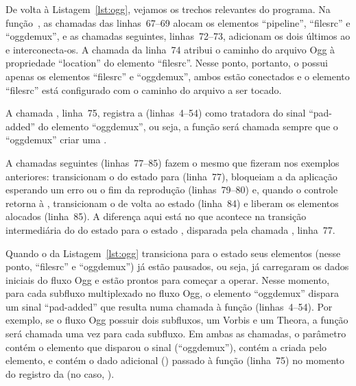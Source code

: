 \documentclass{SBCbookchapter}
\begin{document}
De volta à Listagem~\ref{lst:ogg}, vejamos os trechos relevantes do
programa.  Na função~, as chamadas das linhas~67--69 alocam os
elementos ``pipeline'', ``filesrc'' e ``oggdemux'', e as chamadas seguintes,
linhas~72--73, adicionam os dois últimos ao  e interconecta-os.
A chamada da linha~74 atribui o caminho do arquivo Ogg à propriedade
``location'' do elemento ``filesrc''.  Nesse ponto, portanto, o
 possui apenas os elementos ``filesrc'' e ``oggdemux'', ambos
estão conectados e o elemento ``filesrc'' está configurado com o caminho do
arquivo a ser tocado.

A chamada , linha~75, registra a 
 (linhas~4--54) como tratadora do sinal ``pad-added'' do
elemento ``oggdemux'', ou seja, a função  será chamada
sempre que o ``oggdemux'' criar uma .

A chamadas seguintes (linhas~77--85) fazem o mesmo que fizeram nos exemplos
anteriores: transicionam o  do estado  para
 (linha~77), bloqueiam a  da aplicação esperando um
erro ou o fim da reprodução (linhas~79--80) e, quando o controle retorna à
, transicionam o  de volta ao estado 
(linha~84) e liberam os elementos alocados (linha~85).  A diferença aqui
está no que acontece na transição intermediária do  do estado
 para o estado , disparada pela chamada
, linha~77.

Quando o  da Listagem~\ref{lst:ogg} transiciona para o estado
 seus elementos (nesse ponto, ``filesrc'' e ``oggdemux'') já
estão pausados, ou seja, já carregaram os dados iniciais do fluxo Ogg e
estão prontos para começar a operar.  Nesse momento, para cada subfluxo
multiplexado no fluxo Ogg, o elemento ``oggdemux'' dispara um sinal
``pad-added'' que resulta numa chamada à função 
(linhas~4--54).  Por exemplo, se o fluxo Ogg possuir dois subfluxos, um
Vorbis e um Theora, a função  será chamada uma vez para cada
subfluxo.  Em ambas as chamadas, o parâmetro  contém o elemento que
disparou o sinal (``oggdemux''),  contém a 
criada pelo elemento, e  contém o dado adicional ()
passado à função  (linha~75) no momento do registro da
 (no caso, ).
\end{document}
